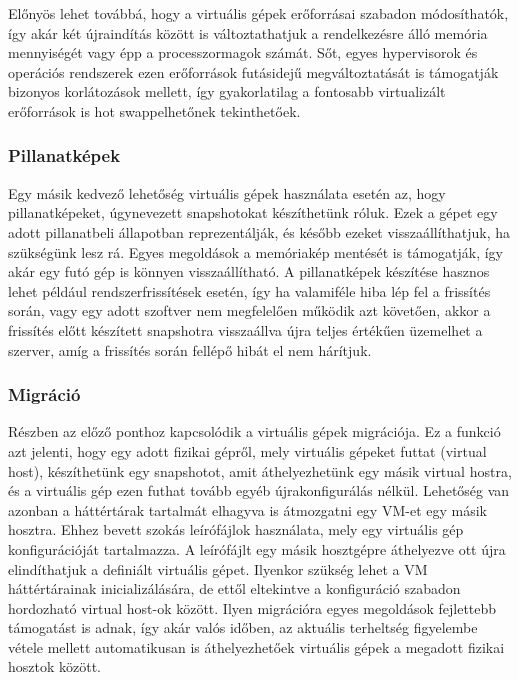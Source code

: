 Előnyös lehet továbbá, hogy a virtuális gépek erőforrásai szabadon módosíthatók, így akár két újraindítás között is változtathatjuk a rendelkezésre álló memória mennyiségét vagy épp a processzormagok számát. Sőt, egyes hypervisorok és operációs rendszerek ezen erőforrások futásidejű megváltoztatását is támogatják bizonyos korlátozások mellett, így gyakorlatilag a fontosabb virtualizált erőforrások is hot swappelhetőnek tekinthetőek.

\subsubsection{Pillanatképek}
Egy másik kedvező lehetőség virtuális gépek használata esetén az, hogy pillanatképeket, úgynevezett snapshotokat készíthetünk róluk. Ezek a gépet egy adott pillanatbeli állapotban reprezentálják, és később ezeket visszaállíthatjuk, ha szükségünk lesz rá. Egyes megoldások a memóriakép mentését is támogatják, így akár egy futó gép is könnyen visszaállítható. A pillanatképek készítése hasznos lehet például rendszerfrissítések esetén, így ha valamiféle hiba lép fel a frissítés során, vagy egy adott szoftver nem megfelelően működik azt követően, akkor a frissítés előtt készített snapshotra visszaállva újra teljes értékűen üzemelhet a szerver, amíg a frissítés során fellépő hibát el nem hárítjuk.

\subsubsection{Migráció}
Részben az előző ponthoz kapcsolódik a virtuális gépek migrációja. Ez a funkció azt jelenti, hogy egy adott fizikai gépről, mely virtuális gépeket futtat (virtual host), készíthetünk egy snapshotot, amit áthelyezhetünk egy másik virtual hostra, és a virtuális gép ezen futhat tovább egyéb újrakonfigurálás nélkül.
Lehetőség van azonban a háttértárak tartalmát elhagyva is átmozgatni egy VM-et egy másik hosztra. Ehhez bevett szokás leírófájlok használata, mely egy virtuális gép konfigurációját tartalmazza. A leírófájlt egy másik hosztgépre áthelyezve ott újra elindíthatjuk a definiált virtuális gépet. Ilyenkor szükség lehet a VM háttértárainak inicializálására, de ettől eltekintve a konfiguráció szabadon hordozható virtual host-ok között. Ilyen migrációra egyes megoldások fejlettebb támogatást is adnak, így akár valós időben, az aktuális terheltség figyelembe vétele mellett automatikusan is áthelyezhetőek virtuális gépek a megadott fizikai hosztok között.

